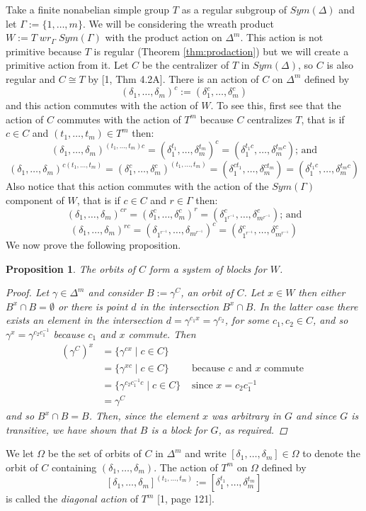 \documentclass[]{article}
\newtheorem{prop}[thm]{Proposition}
\theoremstyle{definition}
\begin{document}
Take a finite nonabelian simple group $T$ as a regular subgroup of $Sym(\Delta)$ and let $\Gamma:=\{1,\dots,m\}$. We will be considering the wreath product $W:=T \; wr_\Gamma \; Sym(\Gamma)$ with the product action on $\Delta^m$. This action is not primitive because $T$ is regular (Theorem \ref{thm:prodaction}) but we will create a primitive action from it. Let $C$ be the centralizer of $T$ in $Sym(\Delta)$, so $C$ is also regular and $C \cong T$ by [1, Thm 4.2A]. 
There is an action of $C$ on $\Delta^m$ defined by
$$(\delta_1,\dots,\delta_m)^c:=(\delta_1^c,\dots,\delta_m^c) $$
and this action commutes with the action of $W$. To see this, first see that the action of $C$ commutes with the action of $T^m$ because $C$ centralizes $T$, that is if $c \in C$ and $(t_1,\dots,t_m) \in T^m$ then:
$$(\delta_1,\dots,\delta_m)^{(t_1,\dots,t_m)c} = (\delta_1^{t_1},\dots,\delta_m^{t_m})^c = (\delta_1^{t_1c},\dots,\delta_m^{t_mc}) \mbox{; and} $$
$$(\delta_1,\dots,\delta_m)^{c(t_1,\dots,t_m)} =
(\delta_1^{c},\dots,\delta_m^{c})^{(t_1,\dots,t_m)} = (\delta_1^{ct_1},\dots,\delta_m^{ct_m}) = (\delta_1^{t_1c},\dots,\delta_m^{t_mc}) $$
Also notice that this action commutes with the action of the $Sym(\Gamma)$ component of $W$, that is if $c \in C$ and $r \in \Gamma$ then:
$$(\delta_1,\dots,\delta_m)^{cr} = (\delta_1^{c},\dots,\delta_m^{c})^r = (\delta_{1^{r^{-1}}}^{c},\dots,\delta_{m^{r^{-1}}}^{c}) \mbox{; and}$$
$$(\delta_1,\dots,\delta_m)^{rc} =
(\delta_{1^{r^{-1}}},\dots,\delta_{m^{r^{-1}}})^c = (\delta_{1^{r^{-1}}}^{c},\dots,\delta_{m^{r^{-1}}}^{c})$$
We now prove the following proposition.

\begin{prop}
	The orbits of $C$ form a system of blocks for $W$.
\begin{proof}
	Let $\gamma \in \Delta^m$ and consider $B:=\gamma^C$, an orbit of $C$. Let $x \in W$ then either $B^x \cap B = \emptyset$ or there is point $d$ in the intersection $B^x \cap B$. In the latter case there exists an element in the intersection $d=\gamma^{c_1x} =\gamma^{c_2}$, for some $c_1,c_2 \in C$, and so $\gamma^{x}=\gamma^{c_2c_1^{-1}}$ because $c_1$ and $x$ commute. Then
	\begin{align*}
	(\gamma^C)^x & = \{\gamma^{cx} \; | \; c \in C \} & \\
	& = \{\gamma^{xc} \; | \; c \in C \} & \mbox{ because } c \mbox{ and } x \mbox{ commute }  \\
	& = \{\gamma^{c_2c_1^{-1}c} \; | \; c \in C \} & \mbox{ since } x=c_2c_1^{-1} \\
	& = \gamma^C
 	\end{align*}
 	and so $B^x \cap B = B$. Then, since the element $x$ was arbitrary in $G$ and since $G$ is transitive, we have shown that $B$ is a block for $G$, as required.
\end{proof}
\end{prop}
We let $\Omega$ be the set of orbits of $C$ in $\Delta^m$ and write $[\delta_1,\dots,\delta_m] \in \Omega$ to denote the orbit of $C$ containing $(\delta_1,\dots,\delta_m)$. The action of $T^m$ on $\Omega$ defined by
$$[\delta_1,\dots,\delta_m]^{(t_1,\dots,t_m)} := [\delta_1^{t_1},\dots,\delta_m^{t_m}]$$
is called the \emph{diagonal action} of $T^m$ [1, page 121]. 
\end{document}
